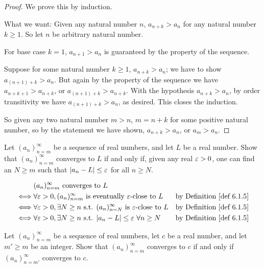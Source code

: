 \begin{proof}
We prove this by induction.

What we want: Given any natural number \(n\), \(a_{n + k} > a_n\) for any natural number \(k \ge 1\). So let \(n\) be arbitrary natural number.

For base case \(k = 1\), \(a_{n + 1} > a_n\) is guaranteed by the property of the sequence.

Suppose for some natural number \(k \ge 1\), \(a_{n + k} > a_n\);
we have to show \(a_{(n + 1) + k} > a_n\).
But again by the property of the sequence we have \(a_{n + k + 1} > a_{n + k}\), or \(a_{(n + 1) + k} > a_{n + k}\).
With the hypothesis \(a_{n + k} > a_n\), by order transitivity  we have \(a_{(n + 1) + k} > a_n\), as desired.
This closes the induction.

So given any two natural number \(m > n\), \(m = n + k\) for some positive natural number, so by the statement we have shown, \(a_{n + k} > a_n\), or \(a_m > a_n\).
\end{proof}

\begin{exercise} \label{exercise 6.1.2}
Let \((a_n)_{n = m}^{\infty}\) be a sequence of real numbers, and let \(L\) be a real number.
Show that \((a_n)_{n = m}^{\infty}\) converges to \(L\) if and only if,
given any real \(\varepsilon > 0\), one can find an \(N \ge m\) such that \(\lvert a_n - L\rvert \le \varepsilon\) for all \(n \ge N\).
\end{exercise}

\begin{align*}
         & (a_n)_{n = m}^{\infty} \text{ converges to } L \\
    \iff & \forall \varE > 0, (a_n)_{n = m}^{\infty} \text{ is eventually } \varE\text{-close to } L & \text{by \DEF{6.1.5}} \\
    \iff & \forall \varE > 0, \exists N \ge n \text{ s.t. } (a_n)_{n = N}^{\infty} \text{ is } \varE\text{-close to } L & \text{by \DEF{6.1.5}} \\
    \iff & \forall \varE > 0, \exists N \ge n \text{ s.t. } \abs{a_n - L} \le \varE\ \forall n \ge N & \text{by \DEF{6.1.5}}
\end{align*}

\begin{exercise} \label{exercise 6.1.3}
Let \((a_n)_{n = m}^{\infty}\) be a sequence of real numbers, let \(c\) be a real number, and let \(m' \ge m\) be an integer.
Show that \((a_n)_{n = m}^{\infty}\) converges to \(c\) if and only if \((a_n)_{n = m'}^{\infty}\) converges to \(c\).
\end{exercise}

